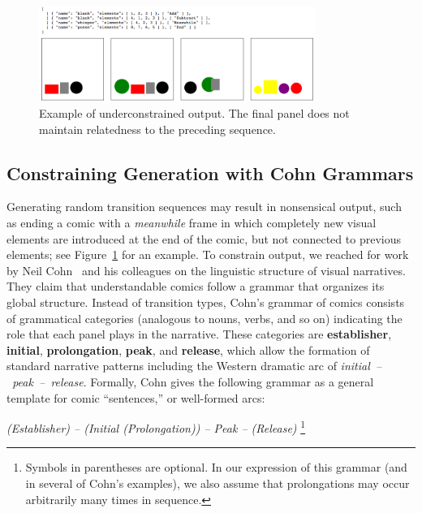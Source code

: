 

\begin{figure}
\centering
\includegraphics[width=9cm]{comicgen-underconstrained-2.png}
\caption{Example of underconstrained output. The final panel does not
maintain relatedness to the preceding sequence.}
\label{fig:outbad}
\end{figure}

\subsection{Constraining Generation with Cohn Grammars}
Generating random transition sequences may result in nonsensical output,
such as ending a comic with a \emph{meanwhile} frame in which completely new
visual elements are introduced at the end of the comic, but not connected to 
previous elements; see Figure~\ref{fig:outbad} for an example. 
To constrain output, we reached for work by Neil Cohn~\cite{cohn2016visual}
and his colleagues on the linguistic structure of visual narratives. They
claim that understandable comics follow a grammar that organizes its global
structure. Instead of transition types, Cohn's grammar of comics consists
of grammatical categories (analogous to nouns, verbs, and so on) indicating
the role that each panel plays in the narrative. These categories are {\bf
establisher}, {\bf initial}, {\bf prolongation}, {\bf peak}, and {\bf
release}, which allow the formation of standard narrative patterns
including the Western dramatic arc of \hbox{\em initial -- peak --
release}. Formally, Cohn gives the following grammar as a general template
for comic ``sentences,'' or well-formed arcs:

{\it (Establisher) -- (Initial (Prolongation)) -- Peak -- (Release)}
\footnote{Symbols in parentheses are optional. In our expression of this grammar (and
in several of Cohn's examples), we also assume that prolongations may occur
arbitrarily many times in sequence.}

